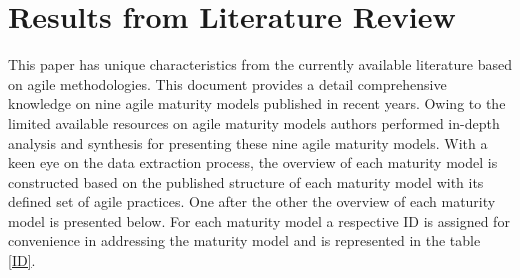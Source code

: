 \documentclass[a4paper,oneside]{bth}
\begin{document}
\section{Results from Literature Review}
This paper has unique characteristics from the currently available literature based on agile methodologies. This document provides a detail comprehensive knowledge on nine agile maturity models published in recent years. Owing to the limited available resources on agile maturity models authors performed in-depth analysis and synthesis for presenting these nine agile maturity models. With a keen eye on the data extraction process, the overview of each maturity model is constructed based on the published structure of each maturity model with its defined set of agile practices. One after the other the overview of each maturity model is presented below. For each maturity model a respective ID is assigned for convenience in addressing the maturity model and is represented in the table \ref{ID}.
\end{document}
